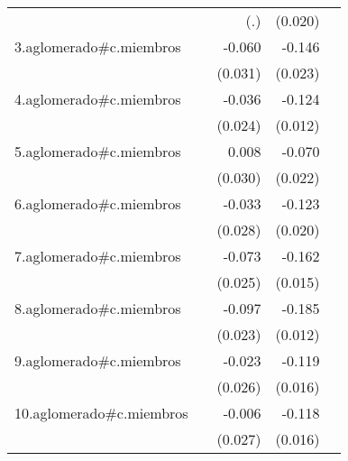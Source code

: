 {\begin{longtable}{l*{4}{D{.}{.}{-1}}}
            &                     &         (.)         &     (0.020)         &                     \\
\addlinespace
3.aglomerado#c.miembros&                     &      -0.060         &      -0.146\sym{***}&                     \\
            &                     &     (0.031)         &     (0.023)         &                     \\
\addlinespace
4.aglomerado#c.miembros&                     &      -0.036         &      -0.124\sym{***}&                     \\
            &                     &     (0.024)         &     (0.012)         &                     \\
\addlinespace
5.aglomerado#c.miembros&                     &       0.008         &      -0.070\sym{**} &                     \\
            &                     &     (0.030)         &     (0.022)         &                     \\
\addlinespace
6.aglomerado#c.miembros&                     &      -0.033         &      -0.123\sym{***}&                     \\
            &                     &     (0.028)         &     (0.020)         &                     \\
\addlinespace
7.aglomerado#c.miembros&                     &      -0.073\sym{**} &      -0.162\sym{***}&                     \\
            &                     &     (0.025)         &     (0.015)         &                     \\
\addlinespace
8.aglomerado#c.miembros&                     &      -0.097\sym{***}&      -0.185\sym{***}&                     \\
            &                     &     (0.023)         &     (0.012)         &                     \\
\addlinespace
9.aglomerado#c.miembros&                     &      -0.023         &      -0.119\sym{***}&                     \\
            &                     &     (0.026)         &     (0.016)         &                     \\
\addlinespace
10.aglomerado#c.miembros&                     &      -0.006         &      -0.118\sym{***}&                     \\
            &                     &     (0.027)         &     (0.016)         &                     \\

\end{longtable}}
